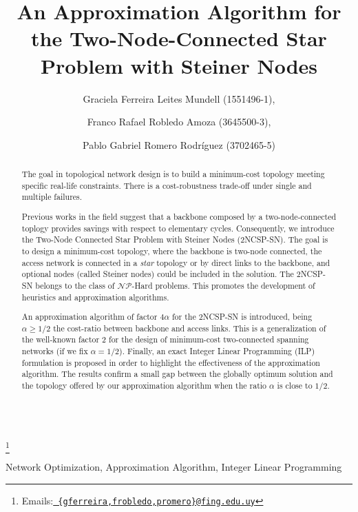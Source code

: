 \documentclass{endm}
\begin{document}
\begin{verbatim}\end{verbatim}\vspace{2.5cm}

\begin{frontmatter}

\title{An Approximation Algorithm for the Two-Node-Connected Star Problem with Steiner Nodes}

\author{Graciela Ferreira Leites Mundell (1551496-1),}
\author{Franco Rafael Robledo Amoza (3645500-3),}
\author{Pablo Gabriel Romero Rodr\'iguez (3702465-5)}

\address{Instituto de Matem\'atica y Estad\'istica\\ Facultad de Ingenier\'ia. Universidad de la Rep\'ublica\\ Montevideo, Uruguay}
\thanks[mails]{Emails:\href{mailto:gferreira@fing.edu.uy} {\texttt{\normalshape
   \{gferreira,frobledo,promero\}@fing.edu.uy}}}

\begin{abstract}
\setlength{\parindent}{12pt}
The goal in topological network design is to build a minimum-cost topology meeting specific real-life constraints.
There is a cost-robustness trade-off under single and multiple failures.

Previous works in the field suggest that a backbone composed by a two-node-connected toplogy provides savings with respect to elementary cycles.
Consequently, we introduce the Two-Node Connected Star Problem with Steiner Nodes (2NCSP-SN). The goal is to design a minimum-cost topology,
where the backbone is two-node connected, the access network is connected in a \emph{star} topology or by direct links to the backbone,
and optional nodes (called Steiner nodes) could be included in the solution. The 2NCSP-SN belongs to the class of $\mathcal{NP}$-Hard problems.
This promotes the development of heuristics and approximation algorithms.

An approximation algorithm of factor $4\alpha$ for the 2NCSP-SN is introduced, being $\alpha \geq 1/2$ the cost-ratio between backbone and access links.
This is a generalization of the well-known factor 2 for the design of minimum-cost two-connected spanning networks (if we fix $\alpha=1/2$).
Finally, an exact Integer Linear Programming (ILP) formulation is proposed in order to highlight the effectiveness of the approximation algorithm.
The results confirm a small gap between the globally optimum solution and the topology offered by our approximation algorithm when the ratio $\alpha$ is close to $1/2$.
\end{abstract}

\begin{keyword}
Network Optimization, Approximation Algorithm, Integer Linear Programming
\end{keyword}

\end{frontmatter}
\end{document}
